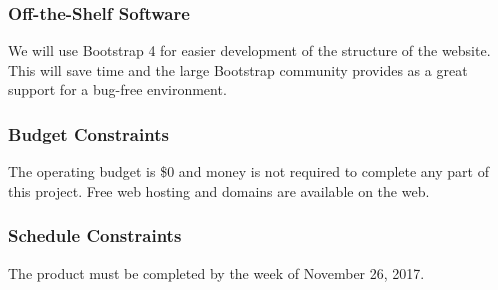 \documentclass[12pt, titlepage]{article}
\begin{document}
\subsubsection{Off-the-Shelf Software}
We will use Bootstrap 4 for easier development of the structure of the website. This will save time and the large Bootstrap community provides as a great support for a bug-free environment.
\subsubsection{Budget Constraints}
The operating budget is \$0 and money is not required to complete any part of this project. Free web hosting and domains are available on the web.
\subsubsection{Schedule Constraints}
The product must be completed by the week of November 26, 2017.
\end{document}
